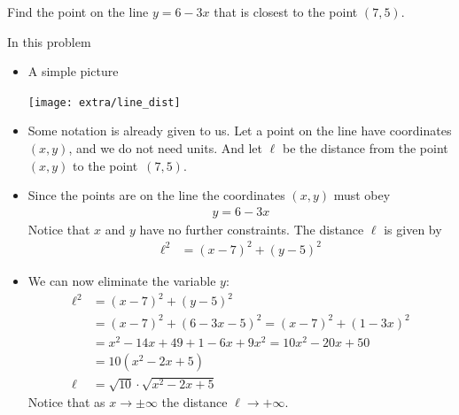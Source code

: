 \begin{eg}\label{APPglobalMaxMinD}
Find the point on the line $y=6-3x$ that is closest to the point $(7,5)$.

\soln In this problem

\begin{itemize}
 \item A simple picture
\begin{efig}
 \begin{center}
  \texttt{[image: extra/line\_dist]}
 \end{center}
\end{efig}
  \item Some notation is already given to us. Let a point on the line have coordinates
$(x,y)$, and we do not need units. And let $\ell$ be the distance from the point $(x,y)$
to the point~$(7,5)$.
\item Since the points are on the line the coordinates $(x,y)$ must obey
\begin{align*}
  y=6-3x
\end{align*}
Notice that $x$ and $y$ have no further constraints. The distance $\ell$ is given by
\begin{align*}
  \ell^2 &= (x-7)^2 + (y-5)^2
\end{align*}
\item We can now eliminate the variable $y$:
\begin{align*}
  \ell^2 &= (x-7)^2 + (y-5)^2 \\
  &= (x-7)^2 + (6-3x-5)^2 = (x-7)^2 + (1-3x)^2 \\
  &= x^2-14x+49 + 1-6x+9x^2 = 10x^2-20x+50 \\
  &= 10(x^2-2x+5) \\
  \ell &= \sqrt{10} \cdot \sqrt{x^2-2x+5}
\end{align*}
Notice that as $x \to \pm \infty$ the distance $\ell \to +\infty$.


\end{itemize}
\end{eg}
